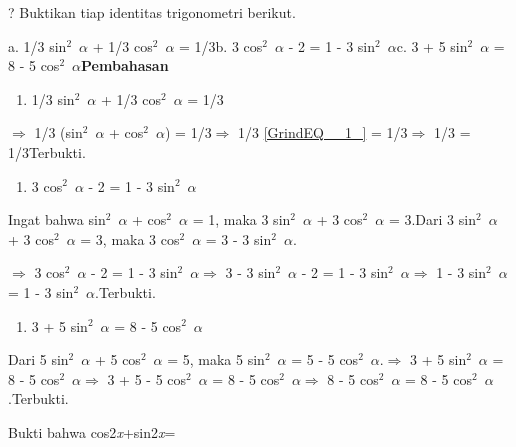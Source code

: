\documentclass[11pt,fleqn]{book} %
\begin{document}
\noindent 

\noindent ?  Buktikan tiap identitas trigonometri berikut.

\noindent a. 1/3 sin${}^{2}$~$\alpha$ + 1/3 cos${}^{2}$~$\alpha$ = 1/3b. 3 cos${}^{2}$~$\alpha$ - 2 = 1 - 3 sin${}^{2}$~$\alpha$c. 3 + 5 sin${}^{2}$~$\alpha$ = 8 - 5 cos${}^{2}$~$\alpha$\textbf{Pembahasan}

\begin{enumerate}
\item  1/3 sin${}^{2}$~$\alpha$ + 1/3 cos${}^{2}$~$\alpha$ = 1/3
\end{enumerate}

\noindent $\mathrm{\Rightarrow }$ 1/3 (sin${}^{2}$~$\alpha$ + cos${}^{2}$~$\alpha$) = 1/3$\mathrm{\Rightarrow }$ 1/3 \eqref{GrindEQ__1_} = 1/3$\mathrm{\Rightarrow }$ 1/3 = 1/3Terbukti.

\begin{enumerate}
\item  3 cos${}^{2}$~$\alpha$ - 2 = 1 - 3 sin${}^{2}$~$\alpha$
\end{enumerate}

\noindent Ingat bahwa sin${}^{2}$~$\alpha$ + cos${}^{2}$~$\alpha$ = 1, maka 3 sin${}^{2}$~$\alpha$ + 3 cos${}^{2}$~$\alpha$ = 3.Dari 3 sin${}^{2}$~$\alpha$ + 3 cos${}^{2}$~$\alpha$ = 3, maka 3 cos${}^{2}$~$\alpha$ = 3 - 3 sin${}^{2}$~$\alpha$.

\noindent $\mathrm{\Rightarrow }$ 3 cos${}^{2}$~$\alpha$ - 2 = 1 - 3 sin${}^{2}$~$\alpha$$\mathrm{\Rightarrow }$ 3 - 3 sin${}^{2}$~$\alpha$ - 2 = 1 - 3 sin${}^{2}$~$\alpha$$\mathrm{\Rightarrow }$ 1 - 3 sin${}^{2}$~$\alpha$ = 1 - 3 sin${}^{2}$~$\alpha$.Terbukti.

\begin{enumerate}
\item  3 + 5 sin${}^{2}$~$\alpha$ = 8 - 5 cos${}^{2}$~$\alpha$
\end{enumerate}

\noindent Dari 5 sin${}^{2}$~$\alpha$ + 5 cos${}^{2}$~$\alpha$ = 5, maka 5 sin${}^{2}$~$\alpha$ = 5 - 5 cos${}^{2}$~$\alpha$.$\mathrm{\Rightarrow }$ 3 + 5 sin${}^{2}$~$\alpha$ = 8 - 5 cos${}^{2}$~$\alpha$$\mathrm{\Rightarrow }$ 3 + 5 - 5 cos${}^{2}$~$\alpha$ = 8 - 5 cos${}^{2}$~$\alpha$$\mathrm{\Rightarrow }$ 8 - 5 cos${}^{2}$~$\alpha$ = 8 - 5 cos${}^{2}$~$\alpha$.Terbukti.~

\noindent \textbf{}

\noindent Bukti bahwa cos2\textit{x}+sin2\textit{x}=

\end{document}
